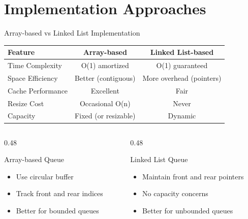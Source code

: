 \documentclass[aspectratio=169,xcolor=dvipsnames]{beamer}
\begin{document}
\section{Implementation Approaches}

\begin{frame}{Array-based vs Linked List Implementation}
  \begin{center}
    \begin{tabular}{l|c|c}
      \toprule
      \textbf{Feature} & \textbf{Array-based} & \textbf{Linked List-based} \\
      \midrule
      Time Complexity & O(1) amortized & O(1) guaranteed \\
      Space Efficiency & Better (contiguous) & More overhead (pointers) \\
      Cache Performance & Excellent & Fair \\
      Resize Cost & Occasional O(n) & Never \\
      Capacity & Fixed (or resizable) & Dynamic \\
      \bottomrule
    \end{tabular}
  \end{center}

  \vspace{0.5cm}

  \begin{columns}
    \begin{column}{0.48\textwidth}
      \begin{block}{Array-based Queue}
        \begin{itemize}
          \item Use circular buffer
          \item Track front and rear indices
          \item Better for bounded queues
        \end{itemize}
      \end{block}
    \end{column}
    \begin{column}{0.48\textwidth}
      \begin{block}{Linked List Queue}
        \begin{itemize}
          \item Maintain front and rear pointers
          \item No capacity concerns
          \item Better for unbounded queues
        \end{itemize}
      \end{block}
    \end{column}
  \end{columns}
\end{frame}
\end{document}
